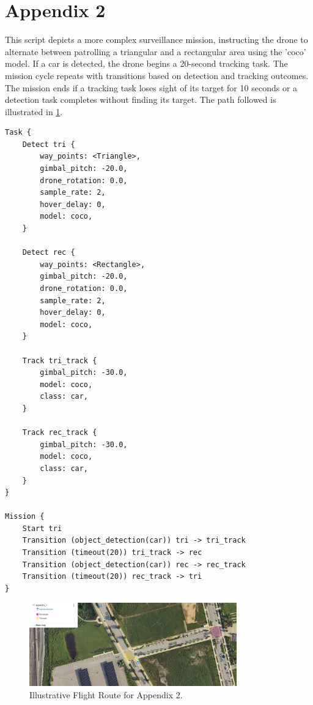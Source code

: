 \section{Appendix 2}
This script depicts a more complex surveillance mission, instructing the drone to alternate between patrolling a triangular and a rectangular area using the 'coco' model. If a car is detected, the drone begins a 20-second tracking task. The mission cycle repeats with transitions based on detection and tracking outcomes. The mission ends if a tracking task loses sight of its target for 10 seconds or a detection task completes without finding its target. The path followed is illustrated in \ref{fig:appendix_1}.
\begin{lstlisting}[style=customgo]
Task {
    Detect tri {
        way_points: <Triangle>,
        gimbal_pitch: -20.0,
        drone_rotation: 0.0,
        sample_rate: 2,
        hover_delay: 0,
        model: coco,
    }
    
    Detect rec {
        way_points: <Rectangle>,
        gimbal_pitch: -20.0,
        drone_rotation: 0.0,
        sample_rate: 2,
        hover_delay: 0,
        model: coco,
    }

    Track tri_track {
        gimbal_pitch: -30.0,
        model: coco,
        class: car,
    }
    
    Track rec_track {
        gimbal_pitch: -30.0,
        model: coco,
        class: car,
    }
}

Mission {
    Start tri
    Transition (object_detection(car)) tri -> tri_track
    Transition (timeout(20)) tri_track -> rec
    Transition (object_detection(car)) rec -> rec_track
    Transition (timeout(20)) rec_track -> tri
}
\end{lstlisting}

\begin{figure}[H]
    \centering
    \includegraphics[width=0.8\textwidth]{Pictures/thesis_appendix_2.png}
    \caption{Illustrative Flight Route for Appendix 2.}
    \label{fig:appendix_1}
\end{figure}

